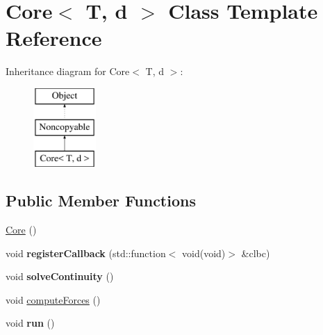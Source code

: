 \hypertarget{classCore}{}\section{Core$<$ T, d $>$ Class Template Reference}
\label{classCore}
Inheritance diagram for Core$<$ T, d $>$\+:\begin{figure}[H]
\begin{center}
\leavevmode
\includegraphics[height=3.000000cm]{classCore}
\end{center}
\end{figure}
\subsection*{Public Member Functions}
\begin{DoxyCompactItemize}
\item 
\hyperlink{classCore_ab22806e0a6b4cc36e65d37949412b375}{Core} ()
\item 
\hypertarget{classCore_a9003d25625be679e1d30d846072a62cd}{}\label{classCore_a9003d25625be679e1d30d846072a62cd} 
void {\bfseries register\+Callback} (std\+::function$<$ void(void)$>$ \&clbc)
\item 
\hypertarget{classCore_ae6e2523d22f842f9b987babf1059ed18}{}\label{classCore_ae6e2523d22f842f9b987babf1059ed18} 
void {\bfseries solve\+Continuity} ()
\item 
void \hyperlink{classCore_a1c4bb6ec0e601092692fee50317fa0ca}{compute\+Forces} ()
\item 
\hypertarget{classCore_a30ce1b6823bce79f57054643956c207c}{}\label{classCore_a30ce1b6823bce79f57054643956c207c} 
void {\bfseries run} ()
\end{DoxyCompactItemize}
